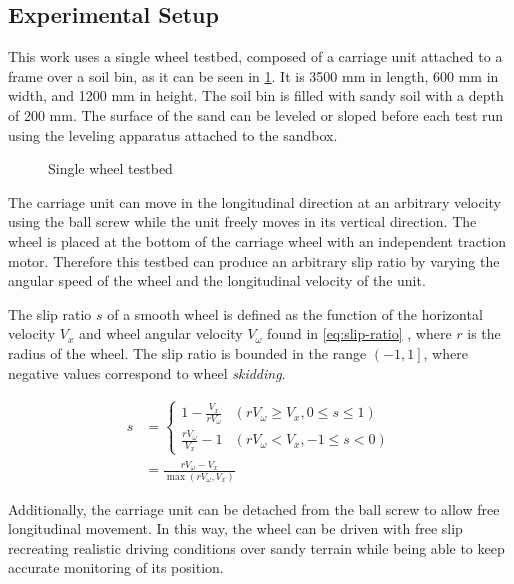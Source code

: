 \subsection{Experimental Setup} \label{subsec:experimental-setup}

This work uses a single wheel testbed, composed of a carriage unit attached to
a frame over a soil bin, as it can be seen in \cref{fig:single-wheel-testbed}.
It is 3500 mm in length, 600 mm in width, and 1200 mm in height. The soil bin
is filled with sandy soil with a depth of 200 mm. The surface of the sand can
be leveled or sloped before each test run using the leveling apparatus attached
to the sandbox.

\begin{figure}
    \centering
    
    \caption{Single wheel testbed}
    \label{fig:single-wheel-testbed}
\end{figure}

The carriage unit can move in the longitudinal direction at an arbitrary
velocity using the ball screw while the unit freely moves in its vertical
direction. The wheel is placed at the bottom of the carriage wheel with an
independent traction motor. Therefore this testbed can produce an arbitrary
slip ratio by varying the angular speed of the wheel and the longitudinal
velocity of the unit. 

The slip ratio $s$ of a smooth wheel is defined as the function of the
horizontal velocity $V_x$ and wheel angular velocity $V_\omega$ found in
\cref{eq:slip-ratio} \cite{Slip2009}, where $r$ is the radius of the wheel. The
slip ratio is bounded in the range $\left(-1,1\right]$, where negative values
correspond to wheel \emph{skidding}.

\begin{equation}
    \begin{split}
    s & = \begin{cases} 
        1 - \frac{V_x}{r V_\omega} & (r V_\omega \geq V_x, 0 \leq s \leq 1) \\
        \frac{r V_\omega}{V_x} - 1 & (r V_\omega < V_x, -1 \leq s < 0)
    \end{cases} \\
    & = \frac{r V_\omega - V_x}{\max(r V_\omega, V_x)}
    \end{split}
    \label{eq:slip-ratio}
\end{equation}

Additionally, the carriage unit can be detached from the ball screw to allow
free longitudinal movement. In this way, the wheel can be driven with free slip
recreating realistic driving conditions over sandy terrain while being able to
keep accurate monitoring of its position.

